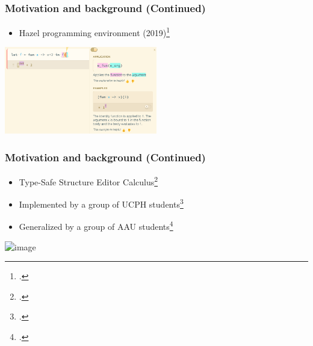\documentclass[t,24pt,aspectratio=169]{beamer}
\begin{document}
\begin{frame}[hvid]
    \frametitle{Motivation and background (Continued)}

    \begin{multicols}{2}
        \begin{itemize}
            \item Hazel programming environment (2019)\footcite{omar}

        \end{itemize}

        \columnbreak
        \includegraphics[width=0.5\textwidth]{img/hazel-ex.png}
    \end{multicols}
\end{frame}

\begin{frame}[hvid]
    \frametitle{Motivation and background (Continued)}

    \begin{multicols}{2}
        \begin{itemize}
            \item<1-> Type-Safe Structure Editor Calculus\footcite{godiksen}
            \item<2-> Implemented by a group of UCPH students\footcite{KU-bach}
            \item<3-> Generalized by a group of AAU students\footcite{aalborg}

        \end{itemize}

        \columnbreak
        \includegraphics<2->[width=0.5\textwidth]{img/ku-editor-ex.png}
    \end{multicols}
\end{frame}
\end{document}
